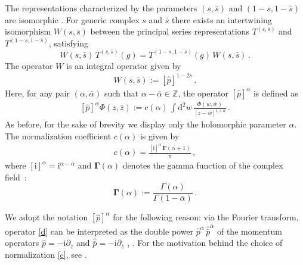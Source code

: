 \documentclass[a4paper,11pt]{article}
\renewcommand{\imath}{\mathrm{i}}
\numberwithin{equation}{section}
\begin{document}
The representations characterized by the parameters $(s, \bar s)$ and $(1-s, 1-\bar{s})$ are isomorphic \cite{Gelfand-Naimark}.
For generic complex $s$ and $\bar{s}$ there exists an intertwining isomorphism $W(s,\bar{s})$ between the principal series representations $T^{(s,\bar{s})}$ and $T^{(1-s,1-\bar{s})}$, satisfying
\begin{equation} \nonumber
    W(s,\bar{s})\,T^{(s,\bar{s})}(g) =
    T^{(1-s,1-\bar{s})}(g)\,W(s,\bar{s})\,.
\end{equation}
The operator $W$ is an integral operator given by \cite{GGV}
\begin{align} \nonumber
    W(s,\bar{s}) := \left[\hat{p}\right]^{1-2s} \,.
\end{align}
Here, for any pair $(\alpha,\bar{\alpha})$ such that $\alpha-\bar{\alpha}\in\mathbb{Z}$, the operator $[\hat{p}]^{\alpha}$ is defined as
\begin{align} \label{d} 
    \left[\hat{p}\right]^{\alpha}\Phi(z,\bar z) :=
    c(\alpha)\,
    \int \mathrm{d}^2 w\,
    \frac{\Phi(w,\bar w)}{[z-w]^{1+\alpha}} \,.
\end{align}
As before, for the sake of brevity we display only the holomorphic parameter $\alpha$.
The normalization coefficient $c(\alpha)$ is given by
\begin{align}\label{c}
    c(\alpha) = \frac{[\imath]^{\alpha}\,\bm{\Gamma}(\alpha+1)}{\pi} \,,
\end{align}
where $[\imath]^{\alpha} = \imath^{\alpha-\bar{\alpha}}$ and $\bm{\Gamma}(\alpha)$ denotes the gamma function of the complex field~\cite{GGR,N}:
\begin{equation} \nonumber
    \bm{\Gamma}(\alpha):=\frac{\Gamma(\alpha)}{\Gamma(1-\bar\alpha)} \,.
\end{equation}

We adopt the notation $[\hat{p}]^\alpha$ for the following reason: via the Fourier transform, operator \eqref{d} can be interpreted as the double power $\hat{p}^\alpha\,\hat{\bar{p}}^{\bar{\alpha}}$ of the momentum operators $\hat{p}=-\imath\partial_z$ and $\hat{\bar{p}}=-\imath\partial_{\bar{z}}$ \cite[Section~2.1]{ADV1}, \cite[Section~2.3]{DM09}. For the motivation behind the choice of normalization \eqref{c}, see \cite[Section~2.1]{ADV1}.
\end{document}
